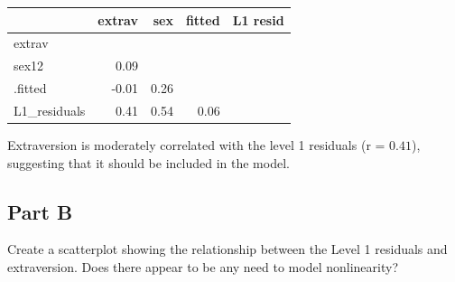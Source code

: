 \documentclass[]{article}
\newenvironment{Shaded}{\begin{snugshade}}{\end{snugshade}}
\newcommand{\KeywordTok}[1]{\textcolor[rgb]{0.13,0.29,0.53}{\textbf{#1}}}
\newcommand{\DataTypeTok}[1]{\textcolor[rgb]{0.13,0.29,0.53}{#1}}
\newcommand{\DecValTok}[1]{\textcolor[rgb]{0.00,0.00,0.81}{#1}}
\newcommand{\StringTok}[1]{\textcolor[rgb]{0.31,0.60,0.02}{#1}}
\newcommand{\OtherTok}[1]{\textcolor[rgb]{0.56,0.35,0.01}{#1}}
\newcommand{\OperatorTok}[1]{\textcolor[rgb]{0.81,0.36,0.00}{\textbf{#1}}}
\newcommand{\NormalTok}[1]{#1}
\begin{document}
\begin{Shaded}
\end{Shaded}

\begin{tabular}{lrrrr}
\toprule
 & extrav & sex & fitted & L1 resid\\
\midrule
extrav &  &  &  & \\
sex12 & 0.09 &  &  & \\
.fitted & -0.01 & 0.26 &  & \\
L1\_residuals & 0.41 & 0.54 & 0.06 & \\
\bottomrule
\end{tabular}

Extraversion is moderately correlated with the level 1 residuals (r =
\(0.41\)), suggesting that it should be included in the model.

\subsection{Part B}\label{part-b-1}

Create a scatterplot showing the relationship between the Level 1
residuals and extraversion. Does there appear to be any need to model
nonlinearity?
\end{document}
